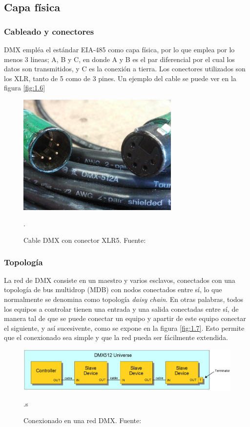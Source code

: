 \subsection{Capa física}
\subsubsection{Cableado y conectores}
DMX empléa el estándar EIA-485 como capa física, por lo que emplea por lo menos 3 lineas; A, B y C, en donde A y B es el par diferencial por el cual los datos son transmitidos, y C es la conexión a tierra. Los conectores utilizados son los XLR, tanto de 5 como de 3 pines. Un ejemplo del cable se puede ver en la figura \ref{fig:1.6} \\

\begin{figure}[!ht]
	\centering
	\includegraphics[width=8cm,scale=1]{resources/1_6-cableDMX.jpg}
	\caption{Cable DMX con conector XLR5. Fuente: \cite{fig1_6}}.
	\label{fig:\thefigure}
\end{figure}

\subsubsection{Topología}
La red de DMX consiste en un maestro y varios esclavos, conectados con una topología de bus multidrop (MDB) con nodos conectados entre sí, lo que normalmente se denomina como topología \textit{daisy chain}. En otras palabras, todos los equipos a controlar tienen una entrada y una salida conectadas entre sí, de manera tal de que se puede conectar un equipo y apartir de este equipo conectar el siguiente, y así sucesivente, como se expone en la figura \ref{fig:1.7}. Esto permite que el conexionado sea simple y que la red pueda ser fácilmente extendida.

\begin{figure}[!ht]
	\centering
	\includegraphics[width=15cm,scale=1]{resources/1_7-topologiaDMX.png}
	\caption{Conexionado en una red DMX. Fuente: \cite{fig1_7}}.s
	\label{fig:\thefigure}
\end{figure}

